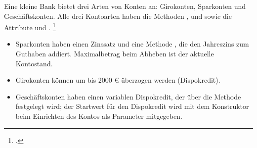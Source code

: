 \documentclass{bschlangaul-aufgabe}
\begin{document}

Eine kleine Bank bietet drei Arten von Konten an: Girokonten, Sparkonten
und Geschäftskonten. Alle drei Kontoarten haben die Methoden
,  und  sowie die
Attribute  und .
\footcite[Seite 60, Oldenburg, Informatik II, S. 128]{oomup:fs:3}

\begin{itemize}
\item Sparkonten haben einen Zinssatz und eine Methode ,
die den Jahreszins zum Guthaben addiert. Maximalbetrag beim Abheben ist
der aktuelle Kontostand.

\item Girokonten können um bis 2000 € überzogen werden (Dispokredit).

\item Geschäftskonten haben einen variablen Dispokredit, der über die
Methode  festgelegt wird; der Startwert für den
Dispokredit wird mit dem Konstruktor beim Einrichten des Kontos als
Parameter mitgegeben.
\end{itemize}
\end{document}
